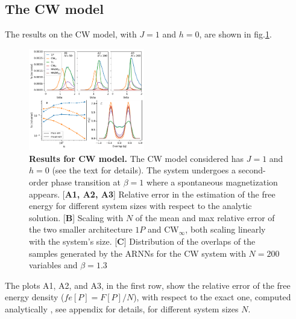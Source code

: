 \documentclass[aps,physrev,10pt,floatfix,reprint]{revtex4-2}
\begin{document}
\subsection{The CW model}
The results on the CW model, with $J=1$ and $h=0$, are shown in fig.\ref{fig:curie_weiss}. 
\begin{figure}[h]
    \centering
    \includegraphics[width=0.45\textwidth]{img/CW_res.pdf}
    \caption{\textbf{Results for CW model.} The CW model considered has $J=1$ and $h=0$ (see the text for details). The system undergoes a second-order phase transition at $\beta=1$ where a spontaneous magnetization appears\cite{kadanoff2000statistical}. [\textbf{A1, A2, A3}] Relative error in the estimation of the free energy for different system sizes with respect to the analytic solution. [\textbf{B}] Scaling with $N$ of the mean and max relative error of the two smaller architecture $1P$ and CW$_{\infty}$, both scaling linearly with the system's size. [\textbf{C}] Distribution of the overlaps of the samples generated by the ARNNs for the CW system with $N=200$ variables and $\beta=1.3$}
    \label{fig:curie_weiss}
\end{figure} 
The plots A1, A2, and A3, in the first row, show the relative error of the free energy density ($fe[P] = F[P]/N$), with respect to the exact one, computed analytically \cite{kadanoff2000statistical}, see appendix for details, for different system sizes $N$.  
\end{document}
